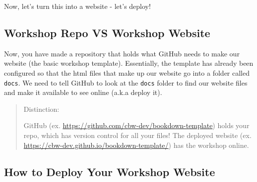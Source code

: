 \documentclass[
]{book}
\theoremstyle{definition}
\theoremstyle{definition}
\theoremstyle{definition}
\theoremstyle{definition}
\theoremstyle{remark}
\begin{document}
Now, let's turn this into a website - let's deploy!

\subsection{Workshop Repo VS Workshop Website}\label{workshop-repo-vs-workshop-website}

Now, you have made a repository that holds what GitHub needs to make our website (the basic workshop template). Essentially, the template has already been configured so that the html files that make up our website go into a folder called \texttt{docs}. We need to tell GitHub to look at the \texttt{docs} folder to find our website files and make it available to see online (a.k.a deploy it).

\begin{quote}
Distinction:

GitHub (ex. \url{https://github.com/cbw-dev/bookdown-template}) holds your repo, which has version control for all your files! The deployed website (ex. \url{https://cbw-dev.github.io/bookdown-template/}) has the workshop online.
\end{quote}

\subsection{How to Deploy Your Workshop Website}\label{how-to-deploy-your-workshop-website}
\end{document}
